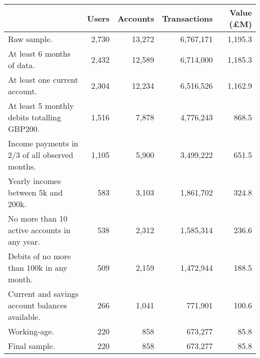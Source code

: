 \begin{tabular}{lrrrr}
\toprule
                                                & Users & Accounts & Transactions & Value (\pounds M) \\
\midrule
                                    Raw sample. & 2,730 &   13,272 &    6,767,171 &           1,195.3 \\
                     At least 6 months of data. & 2,432 &   12,589 &    6,714,000 &           1,185.3 \\
                  At least one current account. & 2,304 &   12,234 &    6,516,526 &           1,162.9 \\
    At least 5 monthly debits totalling GBP200. & 1,516 &    7,878 &    4,776,243 &             868.5 \\
 Income payments in 2/3 of all observed months. & 1,105 &    5,900 &    3,499,222 &             651.5 \\
            Yearly incomes between 5k and 200k. &   583 &    3,103 &    1,861,702 &             324.8 \\
   No more than 10 active accounts in any year. &   538 &    2,312 &    1,585,314 &             236.6 \\
      Debits of no more than 100k in any month. &   509 &    2,159 &    1,472,944 &             188.5 \\
Current and savings account balances available. &   266 &    1,041 &      771,901 &             100.6 \\
                                   Working-age. &   220 &      858 &      673,277 &              85.8 \\
                                  Final sample. &   220 &      858 &      673,277 &              85.8 \\
\bottomrule
\end{tabular}
